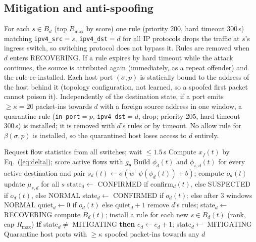 \documentclass[conference]{IEEEtran}
\begin{document}
\subsection{Mitigation and anti-spoofing}
For each $s\in B_d$ (top $R_{\max}$ by score) one rule (priority 200, hard timeout 300\,s) matching \texttt{ipv4\_src}$=s$, \texttt{ipv4\_dst}$=d$ for all IP protocols drops the traffic at $s$'s ingress switch, so switching protocol does not bypass it. Rules are removed when $d$ enters RECOVERING. If a rule expires by hard timeout while the attack continues, the source is attributed again (immediately, as a repeat offender) and the rule re-installed. Each host port $(\sigma,p)$ is statically bound to the address of the host behind it (topology configuration, not learned, so a spoofed first packet cannot poison it). Independently of the destination state, if a port emits $\ge\kappa=20$ packet-ins towards $d$ with a foreign source address in one window, a quarantine rule (\texttt{in\_port}$=p$, \texttt{ipv4\_dst}$=d$, drop; priority 205, hard timeout 300\,s) is installed; it is removed with $d$'s rules or by timeout. No allow rule for $\beta(\sigma,p)$ is installed, so the quarantined host loses access to $d$ entirely.

\begin{algorithm}[t]
\caption{One polling cycle of the controller}\label{alg:main}
\begin{algorithmic}[1]
\STATE Request flow statistics from all switches; wait $\le1.5$\,s
\STATE Compute $x_f(t)$ by Eq.~(\ref{eq:delta}); score active flows with $g_\theta$
\STATE Build $\phi_d(t)$ and $\phi_{s,d}(t)$ for every active destination and pair
  \STATE $s_d(t)\gets\sigma(w^\top\psi(\phi_d(t))+b)$; compute $o_d(t)$
   \STATE update $\mu_{s,d}$ for all $s$ \ENDIF
     \STATE state$_d\gets$ CONFIRMED if confirm$_d(t)$, else SUSPECTED if $o_d(t)$, else NORMAL
     \STATE state$_d\gets$ CONFIRMED if $o_d(t)$; else after 3 windows NORMAL
     \STATE quiet$_d\gets0$ if $o_d(t)$ else quiet$_d+1$
      \STATE remove $d$'s rules; state$_d\gets$ RECOVERING \ENDIF
  \ENDIF
     \STATE compute $B_d(t)$; install a rule for each new $s\in B_d(t)$ (rank, cap $R_{\max}$)
      \STATE \textbf{if} state$_d\neq$ MITIGATING \textbf{then} $e_d\gets e_d+1$; state$_d\gets$ MITIGATING \ENDIF
  \ENDIF
\ENDFOR
\STATE Quarantine host ports with $\ge\kappa$ spoofed packet-ins towards any $d$
\end{algorithmic}
\end{algorithm}
\end{document}
